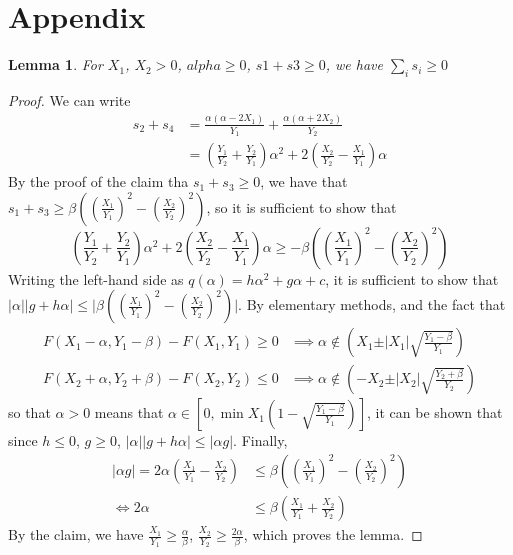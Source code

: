 \documentclass{article}
\newtheorem{lemma}{Lemma}
\theoremstyle{case}
\begin{document}
\section{Appendix}
\begin{lemma}
For $X_1$, $X_2 > 0$, $alpha \geq 0$, $s1 + s3 \geq 0$, we have $\sum_i s_i \geq 0$
\end{lemma}
\begin{proof}
We can write
\begin{align*}
s_2 + s_4 & = \frac{\alpha \left( \alpha - 2X_1\right)}{Y_1}  + \frac{\alpha\left( \alpha + 2X_2\right)}{Y_2} \\
& = \left( \frac{Y_1}{Y_2} + \frac{Y_2}{Y_1}\right)\alpha^2 + 2\left( \frac{X_2}{Y_2} - \frac{X_1}{Y_1} \right)\alpha
\end{align*}
By the proof of the claim tha $s_1 + s_3 \geq 0$, we have that $s_1 + s_3 \geq \beta \left( \left( \frac{X_1}{Y_1}\right)^2 - \left( \frac{X_2}{Y_2}\right)^2 \right)$, so it is sufficient to show that
\[
\left( \frac{Y_1}{Y_2} + \frac{Y_2}{Y_1}\right)\alpha^2 + 2\left( \frac{X_2}{Y_2} - \frac{X_1}{Y_1} \right)\alpha \geq  - \beta\left( \left( \frac{X_1}{Y_1}\right)^2 - \left( \frac{X_2}{Y_2}\right)^2 \right)
\]
Writing the left-hand side as $q\left( \alpha \right) = h\alpha^2 + g\alpha + c$, it is sufficient to show that $\vert \alpha\vert \vert g + h \alpha\vert \leq \vert \beta\left( \left( \frac{X_1}{Y_1}\right)^2 - \left( \frac{X_2}{Y_2}\right)^2 \right) \vert$. By elementary methods, and the fact that 
\begin{align*}
F(X_1-\alpha, Y_1-\beta) - F(X_1, Y_1) \geq 0 & \implies \alpha \not \in \left( X_1 \pm \vert X_1\vert \sqrt{\frac{Y_1-\beta}{Y_1}}\right) \\
F(X_2+\alpha, Y_2+\beta) - F(X_2, Y_2) \leq 0 & \implies \alpha \not \in \left( -X_2 \pm \vert X_2\vert \sqrt{\frac{Y_2 +\beta}{Y_2}} \right)
\end{align*}
so that $\alpha > 0$ means that $\alpha \in \left[ 0, \min{X_1\left( 1 - \sqrt{\frac{Y_1-\beta}{Y_1}}\right)}\right]$, it can be shown that since $h \leq 0$, $g \geq 0$, $\vert \alpha\vert \vert g + h \alpha\vert \leq \vert \alpha g \vert$. Finally,
\begin{align*}
\vert \alpha g \vert = 2\alpha\left( \frac{X_1}{Y_1} - \frac{X_2}{Y_2}\right) & \leq \beta\left( \left(\frac{X_1}{Y_1}\right)^2 - \left(\frac{X_2}{Y_2}\right)^2\right) \\
\iff 2\alpha & \leq \beta\left( \frac{X_1}{Y_1} + \frac{X_2}{Y_2}\right)
\end{align*}
By the claim, we have $\frac{X_1}{Y_1} \geq \frac{\alpha}{\beta}$, $\frac{X_2}{Y_2} \geq \frac{2\alpha}{\beta}$, which proves the lemma.

\end{proof}
\end{document}
